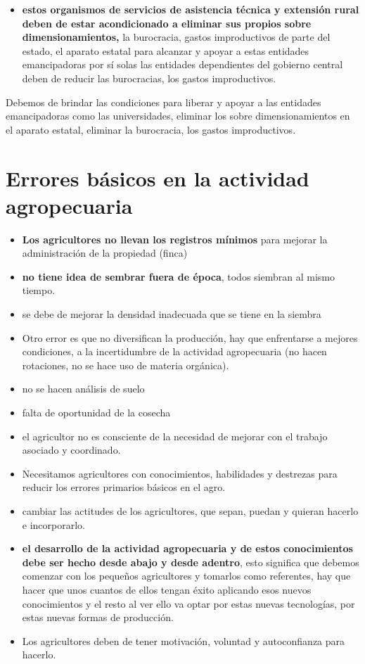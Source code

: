 \documentclass[
  letterpaper,
  DIV=11,
  numbers=noendperiod]{scrartcl}
\providecommand{\tightlist}{%
  \setlength{\itemsep}{0pt}\setlength{\parskip}{0pt}}\usepackage{longtable,booktabs,array}
\begin{document}
\begin{itemize}
\tightlist
\item
  \textbf{estos organismos de servicios de asistencia técnica y
  extensión rural deben de estar acondicionado a eliminar sus propios
  sobre dimensionamientos,} la burocracia, gastos improductivos de parte
  del estado, el aparato estatal para alcanzar y apoyar a estas
  entidades emancipadoras por sí solas las entidades dependientes del
  gobierno central deben de reducir las burocracias, los gastos
  improductivos.
\end{itemize}

Debemos de brindar las condiciones para liberar y apoyar a las entidades
emancipadoras como las universidades, eliminar los sobre
dimensionamientos en el aparato estatal, eliminar la burocracia, los
gastos improductivos.

\hypertarget{errores-buxe1sicos-en-la-actividad-agropecuaria}{%
\section{Errores básicos en la actividad
agropecuaria}\label{errores-buxe1sicos-en-la-actividad-agropecuaria}}

\begin{itemize}
\item
  \textbf{Los agricultores no llevan los registros mínimos} para mejorar
  la administración de la propiedad (finca)
\item
  \textbf{no tiene idea de sembrar fuera de época}, todos siembran al
  mismo tiempo.
\item
  se debe de mejorar la densidad inadecuada que se tiene en la siembra
\item
  Otro error es que no diversifican la producción, hay que enfrentarse a
  mejores condiciones, a la incertidumbre de la actividad agropecuaria
  (no hacen rotaciones, no se hace uso de materia orgánica).
\item
  no se hacen análisis de suelo
\item
  falta de oportunidad de la cosecha
\item
  el agricultor no es consciente de la necesidad de mejorar con el
  trabajo asociado y coordinado.
\item
  Necesitamos agricultores con conocimientos, habilidades y destrezas
  para reducir los errores primarios básicos en el agro.
\item
  cambiar las actitudes de los agricultores, que sepan, puedan y quieran
  hacerlo e incorporarlo.
\item
  \textbf{el desarrollo de la actividad agropecuaria y de estos
  conocimientos debe ser hecho desde abajo y desde adentro}, esto
  significa que debemos comenzar con los pequeños agricultores y
  tomarlos como referentes, hay que hacer que unos cuantos de ellos
  tengan éxito aplicando esos nuevos conocimientos y el resto al ver
  ello va optar por estas nuevas tecnologías, por estas nuevas formas de
  producción.
\item
  Los agricultores deben de tener motivación, voluntad y autoconfianza
  para hacerlo.
\end{itemize}
\end{document}
